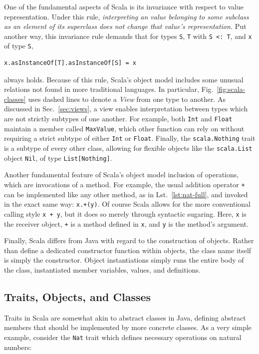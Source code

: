 \documentclass[jou,apacite]{IEEEtran}
\begin{document}
One of the fundamental aspects of Scala is its invariance with respect to value
representation. Under this rule, \emph{interpreting an value belonging to some
  subclass as an element of its superclass does not change that value's
  representation.} Put another way, this invariance rule demands that for types
\texttt{S}, \texttt{T} with \texttt{S~<:~T}, and \texttt{x} of type \texttt{S},
\begin{verbatim}
x.asInstanceOf[T].asInstanceOf[S] = x
\end{verbatim}
always holds. Because of this rule, Scala's object model includes some unusual
relations not found in more traditional languages. In particular,
Fig.~\ref{fig:scala-classes} uses dashed lines to denote a \emph{View} from one
type to another. As discussed in Sec.~\ref{sec:views}, a view enables
interpretation between types which are not strictly subtypes of one another. For
example, both \texttt{Int} and \texttt{Float} maintain a member called
\texttt{MaxValue}, which other function can rely on without requiring a strict
subtype of either \texttt{Int} or \texttt{Float}. Finally, the
\texttt{scala.Nothing} trait is a subtype of every other class, allowing for
flexible objects like the \texttt{scala.List} object \texttt{Nil}, of type
\texttt{List[Nothing]}.

Another fundamental feature of Scala's object model inclusion of operations,
which are invocations of a method. For example, the usual addition operator
\texttt{+} can be implemented like any other method, as in
Lst.~\ref{lst:nat-full}, and invoked in the exact same way: \texttt{x.+(y)}.  Of
course Scala allows for the more conventional calling style \texttt{x + y}, but
it does so merely through syntactic sugaring. Here, \texttt{x} is the receiver
object, \texttt{+} is a method defined in \texttt{x}, and \texttt{y} is the
method's argument.

Finally, Scala differs from Java with regard to the construction of
objects. Rather than define a dedicated constructor function within objects, the
class name itself is simply the constructor. Object instantiations simply runs
the entire body of the class, instantiated member variables, values, and
definitions.

\subsection{Traits, Objects, and Classes}
\label{sec:traits-obj-cls}

Traits in Scala are somewhat akin to abstract classes in Java, defining abstract
members that should be implemented by more concrete classes. As a very simple
example, consider the \texttt{Nat} trait which defines necessary operations on
natural numbers: %
\begin{samepage}
  \inputminted{Scala}{../examples/ExampleNat.scala} %
\end{samepage}
\end{document}
